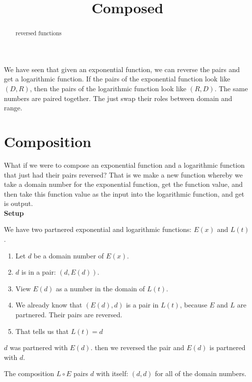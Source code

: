 \documentclass{ximera}
\title{Composed}
\begin{document}
\begin{abstract}
reversed functions
\end{abstract}
\maketitle







We have seen that given an exponential function, we can reverse the pairs and get a logarithmic function.  If the pairs of the exponential function look like $(D,R)$, then the pairs of the logarithmic function look like $(R,D)$.  The same numbers are paired together.  The just swap their roles between domain and range.

\section{Composition}

What if we were to compose an exponential function and a logarithmic function that just had their pairs reversed?  That is we make a new function whereby we take a domain number for the exponential function, get the function value, and then take this function value as the input into the logarithmic function, and get is output. \\





\textbf{Setup}

We have two partnered exponential and logarithmic functions: $E(x)$ and $L(t)$.  \\

\begin{enumerate}
\item Let $d$ be a domain number of $E(x)$.
\item $d$ is in a pair: $(d, E(d))$.
\item View $E(d)$ as a number in the domain of $L(t)$.
\item We already know that $(E(d),d)$ is a pair in $L(t)$, because $E$ and $L$ are partnered.  Their pairs are reversed.
\item That tells us that $L(t)=d$
\end{enumerate}



$d$ was partnered with $E(d)$.  then we reversed the pair and $E(d)$ is partnered with $d$.

The composition $L \circ E$ pairs $d$ with itself: $(d,d)$ for all of the domain numbers. \\
\end{document}
